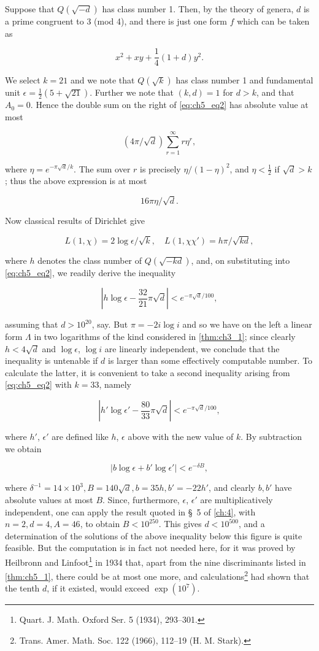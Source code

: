 Suppose that $Q(\sqrt{-d})$ has class number 1. Then, by the theory of genera, $d$ is a prime congruent to 3 (mod 4), and there is just one form $f$ which can be taken as

\[x^2 + xy + \frac{1}{4}(1+d)y^2.\]

We select $k = 21$ and we note that $Q(\sqrt{k})$ has class number 1 and fundamental unit $\epsilon = \frac{1}{2}(5 + \sqrt{21})$. Further we note that $(k,d) = 1$ for $d > k$, and that $A_0 = 0$. Hence the double sum on the right of \eqref{eq:ch5_eq2} has absolute value at most

\[(4\pi/\sqrt{d})\sum_{r=1}^{\infty}r\eta^{r},\]

where $\eta = e^{-\pi\sqrt{d}/k}$. The sum over $r$ is precisely $\eta/(1-\eta)^2$, and $\eta < \frac{1}{2}$ if $\sqrt{d} > k$; thus the above expression is at most

\[ 16\pi \eta / \sqrt{d}. \]

Now classical results of Dirichlet give

\[L(1,\chi) = 2\log \epsilon/\sqrt{k}, \quad L(1,\chi\chi') = h\pi/\sqrt{kd},\]

where $h$ denotes the class number of $Q(\sqrt{-kd})$, and, on substituting into \eqref{eq:ch5_eq2}, we readily derive the inequality

\[\left|h\log\epsilon - \frac{32}{21}\pi\sqrt{d}\right| < e^{-\pi\sqrt{d}/100},\]

assuming that $d > 10^{20}$, say. But $\pi = -2i\log i$ and so we have on the left a linear form $\Lambda$ in two logarithms of the kind considered in \autoref{thm:ch3_1}; since clearly $h < 4\sqrt{d}$ and $\log \epsilon$, $\log i$ are linearly independent, we conclude that the inequality is untenable if $d$ is larger than some effectively computable number. To calculate the latter, it is convenient to take a second inequality arising from \eqref{eq:ch5_eq2} with $k = 33$, namely

\[ |h'\log\epsilon' - \frac{80}{33}\pi\sqrt{d}| < e^{-\pi\sqrt{d}/100}, \]

where $h'$, $\epsilon'$ are defined like $h$, $\epsilon$ above with the new value of $k$. By subtraction we obtain

\[|b\log\epsilon + b'\log\epsilon'| < e^{-\delta B},\]

where $\delta^{-1} = 14 \times 10^3, B = 140\sqrt{d}, b = 35h, b' = -22h'$, and clearly $b, b'$ have absolute values at most $B$. Since, furthermore, $\epsilon$, $\epsilon'$ are multiplicatively independent, one can apply the result quoted in \S~5 of \autoref{ch:4}, with $n=2, d=4, A=46$, to obtain $B<10^{250}$. This gives $d<10^{500}$, and a determination of the solutions of the above inequality below this figure is quite feasible. But the computation is in fact not needed here, for it was proved by Heilbronn and Linfoot\footnote{Quart. J. Math. Oxford Ser. 5 (1934), 293--301.} in 1934 that, apart from the nine discriminants listed in \autoref{thm:ch5_1}, there could be at most one more, and calculations\footnote{Trans. Amer. Math. Soc. 122 (1966), 112--19 (H. M. Stark).} had shown that the tenth $d$, if it existed, would exceed $\exp(10^7)$.

